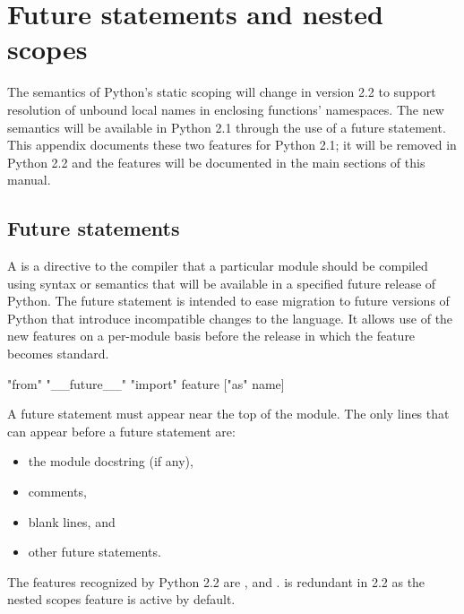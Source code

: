 \chapter{Future statements and nested scopes \label{futures}}


The semantics of Python's static scoping will change in version 2.2 to
support resolution of unbound local names in enclosing functions'
namespaces.  The new semantics will be available in Python 2.1 through
the use of a future statement.  This appendix documents these two
features for Python 2.1; it will be removed in Python 2.2 and the
features will be documented in the main sections of this manual.


\section{Future statements \label{future-statements}}

A  is a directive to
the compiler that a particular module should be compiled using syntax
or semantics that will be available in a specified future release of
Python.  The future statement is intended to ease migration to future
versions of Python that introduce incompatible changes to the
language.  It allows use of the new features on a per-module basis
before the release in which the feature becomes standard.

\begin{productionlist}[*]
             {"from" "__future__" "import" feature ["as" name]}
\end{productionlist}

A future statement must appear near the top of the module.  The only
lines that can appear before a future statement are:

\begin{itemize}

\item the module docstring (if any),
\item comments,
\item blank lines, and
\item other future statements.

\end{itemize}

The features recognized by Python 2.2 are ,
 and .   
is redundant in 2.2 as the nested scopes feature is active by default.

